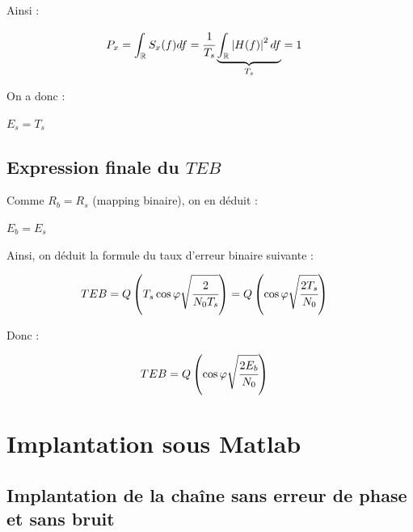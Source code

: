 \documentclass[11pt,a4paper]{report}
\begin{document}
Ainsi : 

\begin{align*}
    P_x & = \displaystyle\int_{\mathbb{R}} S_x(f) df = \cfrac{1}{T_s} \underbrace{\displaystyle\int_{\mathbb{R}} \displaystyle\left\lvert H(f)\right\rvert ^2 df}_{T_s} = 1
\end{align*}

On a donc :

\begin{center}
    $E_s = T_s$
\end{center}


\vspace{0.5cm}

\section{Expression finale du $TEB$}

Comme $R_b = R_s$ (mapping binaire), on en déduit :
\begin{center}
    $E_b = E_s$
\end{center}

Ainsi, on déduit la formule du taux d'erreur binaire suivante :

\begin{align*}
    TEB & = Q\displaystyle\left( T_s\cos\varphi\sqrt{\cfrac{2}{N_0T_s}} \right) = Q\displaystyle\left( \cos\varphi\sqrt{\cfrac{2T_s}{N_0}} \right)
\end{align*}

Donc :

\begin{align*}
    TEB & = Q\displaystyle\left( \cos\varphi\sqrt{\cfrac{2E_b}{N_0}} \right)
\end{align*}


\chapter{Implantation sous Matlab}



\section{Implantation de la chaîne sans erreur de phase et sans bruit}
\end{document}
